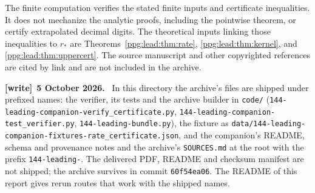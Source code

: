 \documentclass[11pt,letterpaper]{article}
\theoremstyle{remark}\newtheorem{remark}[theorem]{Remark}
\numberwithin{equation}{section}
\newcommand{\file}[1]{\nolinkurl{#1}}
\newenvironment{writenote}[1][]{\par\smallskip\begingroup\small
 \noindent\textbf{[write]}\if\relax\detokenize{#1}\relax\else~\textbf{#1.}\fi\ }%
 {\par\endgroup\smallskip}
\begin{document}
The finite computation verifies the stated finite inputs and certificate inequalities. It does not mechanize the analytic proofs, including the pointwise theorem, or certify extrapolated decimal digits. The theoretical inputs linking those inequalities to $r_*$ are Theorems~\ref{ppg:lead:thm:rate}, \ref{ppg:lead:thm:kernel}, and \ref{ppg:lead:thm:uppercert}. The source manuscript and other copyrighted references are cited by link and are not included in the archive.
\begin{writenote}[5 October 2026]
In this directory the archive's files are shipped under prefixed names: the verifier, its tests and the archive builder in \file{code/} (\file{144-leading-companion-verify_certificate.py}, \file{144-leading-companion-test_verifier.py}, \file{144-leading-bundle.py}), the fixture as \file{data/144-leading-companion-fixtures-rate_certificate.json}, and the companion's README, schema and provenance notes and the archive's \file{SOURCES.md} at the root with the prefix \file{144-leading-}. The delivered PDF, README and checksum manifest are not shipped; the archive survives in commit \texttt{60f54ea06}. The README of this report gives rerun routes that work with the shipped names.
\end{writenote}
\end{document}
